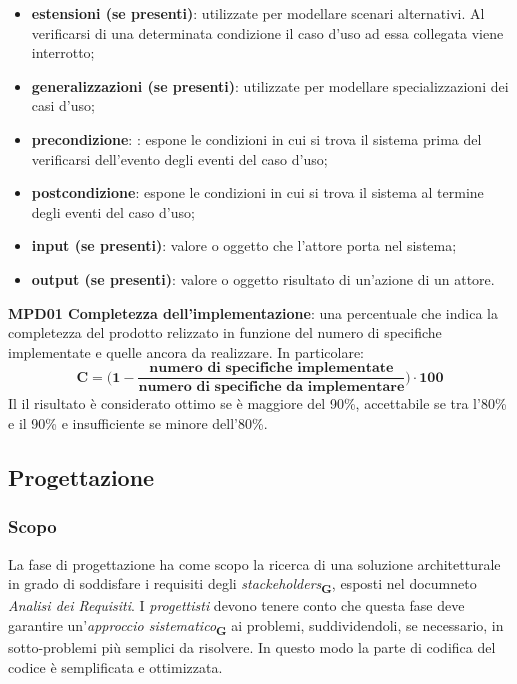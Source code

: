 \begin{itemize}
    \item \textbf{estensioni (se presenti)}: utilizzate per modellare scenari alternativi. Al verificarsi di una determinata condizione il caso d’uso ad essa collegata viene interrotto;
    \item \textbf{generalizzazioni (se presenti)}: utilizzate per modellare specializzazioni dei casi d’uso;
    \item \textbf{precondizione}: : espone le condizioni in cui si trova il sistema prima del verificarsi dell’evento degli eventi del caso d’uso;
    \item \textbf{postcondizione}: espone le condizioni in cui si trova il sistema al termine degli eventi del caso d’uso;
    \item \textbf{input (se presenti)}: valore o oggetto che l’attore porta nel sistema;
    \item \textbf{output (se presenti)}: valore o oggetto risultato di un’azione di un attore.
\end{itemize}
\textbf{MPD01 Completezza dell’implementazione}:
una percentuale che indica la completezza del prodotto relizzato in funzione del numero di specifiche implementate e quelle ancora da realizzare. In particolare:
\textbf{\[\mathbf{C = \biggl( 1 -  \frac{\mbox{numero di specifiche implementate}}{\mbox{numero di specifiche da implementare}} \biggr) \cdot 100}\]}
Il il risultato è considerato ottimo se è maggiore del 90\%, accettabile se tra l'80\% e il 90\% e insufficiente se minore dell'80\%.


\subsection{Progettazione}
\subsubsection{Scopo}
La fase di progettazione ha come scopo la ricerca di una soluzione architetturale in grado di soddisfare i requisiti degli \textit{stackeholders}\textsubscript{\textbf{G}}, esposti nel documneto \textit{Analisi dei Requisiti}.
I \textit{progettisti} devono tenere conto che questa fase deve garantire un'\textit{approccio sistematico}\textsubscript{\textbf{G}} ai problemi, suddividendoli, se necessario, in sotto-problemi più semplici da risolvere.
In questo modo la parte di codifica del codice è semplificata e ottimizzata.
